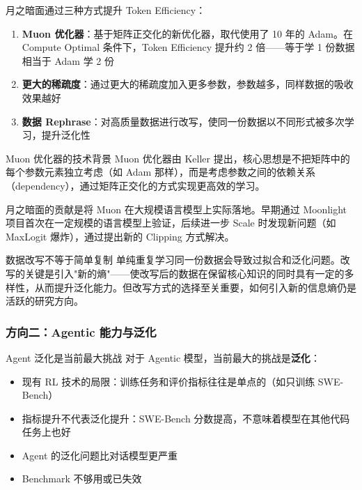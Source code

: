 \documentclass[a4paper]{article}
\begin{document}
月之暗面通过三种方式提升 Token Efficiency：

\begin{enumerate}
    \item \textbf{Muon 优化器}：基于矩阵正交化的新优化器，取代使用了 10 年的 Adam。在 Compute Optimal 条件下，Token Efficiency 提升约 2 倍——等于学 1 份数据相当于 Adam 学 2 份
    \item \textbf{更大的稀疏度}：通过更大的稀疏度加入更多参数，参数越多，同样数据的吸收效果越好
    \item \textbf{数据 Rephrase}：对高质量数据进行改写，使同一份数据以不同形式被多次学习，提升泛化性
\end{enumerate}

\begin{knowledgebox}{Muon 优化器的技术背景}
Muon 优化器由 Keller 提出，核心思想是不把矩阵中的每个参数元素独立考虑（如 Adam 那样），而是考虑参数之间的依赖关系（dependency），通过矩阵正交化的方式实现更高效的学习。

月之暗面的贡献是将 Muon 在大规模语言模型上实际落地。早期通过 Moonlight 项目首次在一定规模的语言模型上验证，后续进一步 Scale 时发现新问题（如 MaxLogit 爆炸），通过提出新的 Clipping 方式解决。
\end{knowledgebox}

\begin{warningbox}{数据改写不等于简单复制}
单纯重复学习同一份数据会导致过拟合和泛化问题。改写的关键是引入"新的熵"——使改写后的数据在保留核心知识的同时具有一定的多样性，从而提升泛化能力。但改写方式的选择至关重要，如何引入新的信息熵仍是活跃的研究方向。
\end{warningbox}

\subsubsection{方向二：Agentic 能力与泛化}

\begin{importantbox}{Agent 泛化是当前最大挑战}
对于 Agentic 模型，当前最大的挑战是\textbf{泛化}：
\begin{itemize}
    \item 现有 RL 技术的局限：训练任务和评价指标往往是单点的（如只训练 SWE-Bench）
    \item 指标提升不代表泛化提升：SWE-Bench 分数提高，不意味着模型在其他代码任务上也好
    \item Agent 的泛化问题比对话模型更严重
    \item Benchmark 不够用或已失效
\end{itemize}
\end{importantbox}
\end{document}
